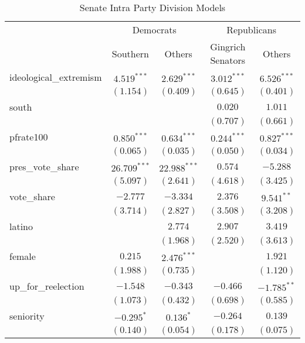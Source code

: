 \documentclass[12pt]{article}
\begin{document}
\begin{table}
	\begin{center}
		\caption{Senate Intra Party Division Models}
		\begin{tabular}{l c c c c }
			\hline
			& \multicolumn{2}{c}{Democrats} & \multicolumn{2}{c}{Republicans} \\
			\cline{2-5}
			& Southern  & Others & Gingrich Senators & Others \\
			\hline
			ideological\_extremism & $4.519^{***}$  & $2.629^{***}$  & $3.012^{***}$  & $6.526^{***}$ \\
			& $(1.154)$      & $(0.409)$      & $(0.645)$      & $(0.401)$     \\
			south                  &                &                & $0.020$        & $1.011$       \\
			&                &                & $(0.707)$      & $(0.661)$     \\
			pfrate100              & $0.850^{***}$  & $0.634^{***}$  & $0.244^{***}$  & $0.827^{***}$ \\
			& $(0.065)$      & $(0.035)$      & $(0.050)$      & $(0.034)$     \\
			pres\_vote\_share      & $26.709^{***}$ & $22.988^{***}$ & $0.574$        & $-5.288$      \\
			& $(5.097)$      & $(2.641)$      & $(4.618)$      & $(3.425)$     \\
			vote\_share            & $-2.777$       & $-3.334$       & $2.376$        & $9.541^{**}$  \\
			& $(3.714)$      & $(2.827)$      & $(3.508)$      & $(3.208)$     \\
			latino                 &                & $2.774$        & $2.907$        & $3.419$       \\
			&                & $(1.968)$      & $(2.520)$      & $(3.613)$     \\
			female                 & $0.215$        & $2.476^{***}$  &                & $1.921$       \\
			& $(1.988)$      & $(0.735)$      &                & $(1.120)$     \\
			up\_for\_reelection    & $-1.548$       & $-0.343$       & $-0.466$       & $-1.785^{**}$ \\
			& $(1.073)$      & $(0.432)$      & $(0.698)$      & $(0.585)$     \\
			seniority              & $-0.295^{*}$   & $0.136^{*}$    & $-0.264$       & $0.139$       \\
			& $(0.140)$      & $(0.054)$      & $(0.178)$      & $(0.075)$     \\

\end{tabular}
\end{center}
\end{table}
\end{document}
